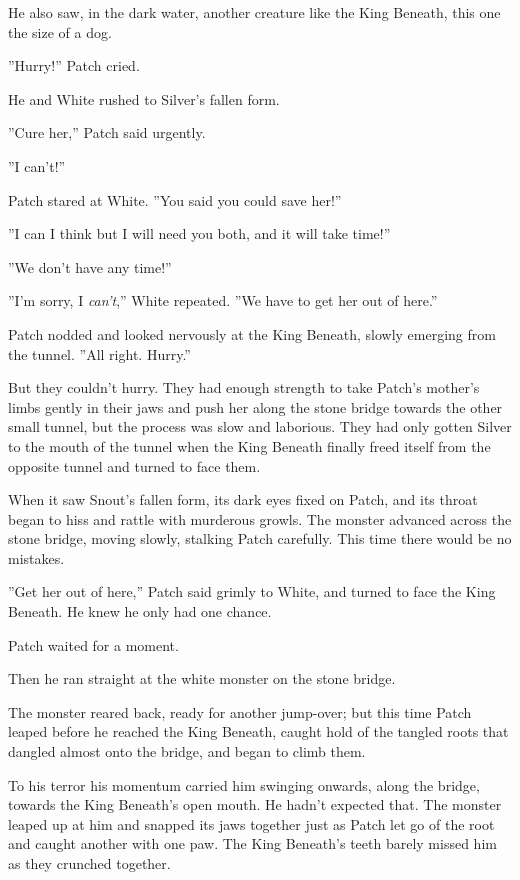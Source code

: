 \documentclass[12pt]{book}
\begin{document}
He also saw, in the dark water, another creature like the King Beneath, this one the size of a dog.

''Hurry!'' Patch cried.

He and White rushed to Silver's fallen form.

''Cure her,'' Patch said urgently.

''I can't!''

Patch stared at White. ''You said you could save her!''

''I can %
I think %
but I will need you both, and it will take time!''

''We don't have any time!''

''I'm sorry, I {\it can't},'' White repeated. ''We have to get her out of here.''

Patch nodded and looked nervously at the King Beneath, slowly emerging from the tunnel. ''All right. Hurry.''

But they couldn't hurry. They had enough strength to take Patch's mother's limbs gently in their jaws and push her along the stone bridge towards the other small tunnel, but the process was slow and laborious. They had only gotten Silver to the mouth of the tunnel when the King Beneath finally freed itself from the opposite tunnel and turned to face them.

When it saw Snout's fallen form, its dark eyes fixed on Patch, and its throat began to hiss and rattle with murderous growls. The monster advanced across the stone bridge, moving slowly, stalking Patch carefully. This time there would be no mistakes.

''Get her out of here,'' Patch said grimly to White, and turned to face the King Beneath. He knew he only had one chance.

Patch waited for a moment.

Then he ran straight at the white monster on the stone bridge.

The monster reared back, ready for another jump-over; but this time Patch leaped before he reached the King Beneath, caught hold of the tangled roots that dangled almost onto the bridge, and began to climb them.

To his terror his momentum carried him swinging onwards, along the bridge, towards the King Beneath's open mouth. He hadn't expected that. The monster leaped up at him %
and snapped its jaws together just as Patch let go of the root and caught another with one paw. The King Beneath's teeth barely missed him as they crunched together.
\end{document}

